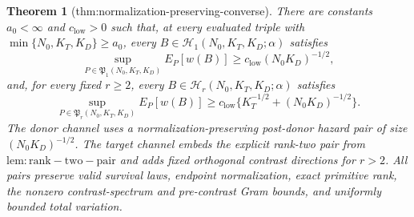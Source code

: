 \documentclass{article}
\newtheorem{theorem}{Theorem}
\begin{document}
\begin{theorem}[thm:normalization-preserving-converse]\label{thm:normalization-preserving-converse}
There are constants \(a_0<\infty\) and \(c_{\mathrm{low}}>0\) such that, at every evaluated triple with \(\min\{N_0,K_T,K_D\}\ge a_0\), every \(B\in\mathcal H_1(N_0,K_T,K_D;\alpha)\) satisfies \[\sup_{P\in\mathfrak P_1(N_0,K_T,K_D)}E_P[w(B)]\ge c_{\mathrm{low}}(N_0K_D)^{-1/2},\] and, for every fixed \(r\ge2\), every \(B\in\mathcal H_r(N_0,K_T,K_D;\alpha)\) satisfies \[\sup_{P\in\mathfrak P_r(N_0,K_T,K_D)}E_P[w(B)]\ge c_{\mathrm{low}}\{K_T^{-1/2}+(N_0K_D)^{-1/2}\}.\] The donor channel uses a normalization-preserving post-donor hazard pair of size \((N_0K_D)^{-1/2}\). The target channel embeds the explicit rank-two pair from \(\mathrm{lem:rank-two-pair}\) and adds fixed orthogonal contrast directions for \(r>2\). All pairs preserve valid survival laws, endpoint normalization, exact primitive rank, the nonzero contrast-spectrum and pre-contrast Gram bounds, and uniformly bounded total variation.
\end{theorem}
\end{document}
